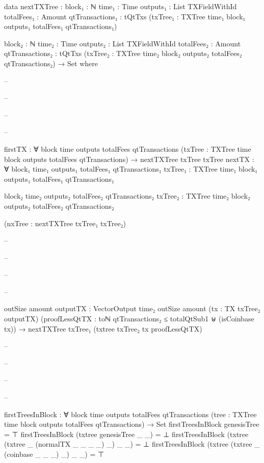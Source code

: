 \documentclass{beamer}
\begin{document}
{\begin{frame}
\begin{code}
      data nextTXTree :
        {block₁ : ℕ}
        {time₁ : Time}
        {outputs₁ : List TXFieldWithId}
        {totalFees₁ : Amount}
        {qtTransactions₁ : tQtTxs}
        (txTree₁ : TXTree time₁ block₁ outputs₁
          totalFees₁ qtTransactions₁)

        {block₂ : ℕ}
        {time₂ : Time}
        {outputs₂ : List TXFieldWithId}
        {totalFees₂ : Amount}
        {qtTransactions₂ : tQtTxs}
        (txTree₂ : TXTree time₂ block₂ outputs₂
          totalFees₂ qtTransactions₂)
        → Set where

-- \end{code}
-- \end{frame}
-- \begin{frame}
-- \begin{code}

        firstTX : ∀ {block time outputs totalFees qtTransactions}
          (txTree : TXTree time block outputs totalFees qtTransactions)
          → nextTXTree txTree txTree
        nextTX : ∀ {block₁ time₁ outputs₁ totalFees₁ qtTransactions₁}
          {txTree₁ : TXTree time₁ block₁
            outputs₁ totalFees₁ qtTransactions₁}

          {block₂ time₂ outputs₂ totalFees₂ qtTransactions₂}
          {txTree₂ : TXTree time₂ block₂
            outputs₂ totalFees₂ qtTransactions₂}

          (nxTree : nextTXTree txTree₁ txTree₂)

-- \end{code}
-- \end{frame}
-- \begin{frame}
-- \begin{code}

          {outSize amount}
          {outputTX : VectorOutput time₂ outSize amount}
          (tx : TX txTree₂ outputTX)
          (proofLessQtTX :
              toℕ qtTransactions₂ ≤ totalQtSub1
              ⊎
              (isCoinbase tx))
          → nextTXTree txTree₁ (txtree txTree₂ tx proofLessQtTX)

-- \end{code}
-- \end{frame}
-- \begin{frame}
-- \begin{code}

      firstTreesInBlock : ∀
        {block time outputs totalFees qtTransactions}
        (tree : TXTree time block outputs totalFees qtTransactions)
        → Set
      firstTreesInBlock genesisTree = ⊤
      firstTreesInBlock (txtree genesisTree _ _) = ⊥
      firstTreesInBlock (txtree (txtree _
        (normalTX _ _ _ _) _) _ _) = ⊥
      firstTreesInBlock (txtree (txtree _
        (coinbase _ _ _) _) _ _) = ⊤


\end{code}
\end{frame}}
\end{document}

